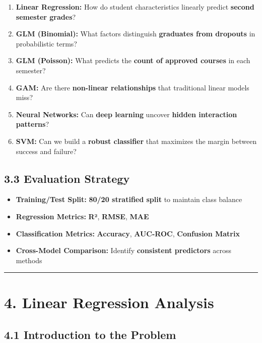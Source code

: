 \documentclass[
]{article}
\providecommand{\tightlist}{%
  \setlength{\itemsep}{0pt}\setlength{\parskip}{0pt}}
\begin{document}
\begin{enumerate}
\def\labelenumi{\arabic{enumi}.}
\tightlist
\item
  \textbf{Linear Regression:} How do student characteristics linearly
  predict \textbf{second semester grades}?
\item
  \textbf{GLM (Binomial):} What factors distinguish \textbf{graduates
  from dropouts} in probabilistic terms?
\item
  \textbf{GLM (Poisson):} What predicts the \textbf{count of approved
  courses} in each semester?
\item
  \textbf{GAM:} Are there \textbf{non-linear relationships} that
  traditional linear models miss?
\item
  \textbf{Neural Networks:} Can \textbf{deep learning} uncover
  \textbf{hidden interaction patterns}?
\item
  \textbf{SVM:} Can we build a \textbf{robust classifier} that maximizes
  the margin between success and failure?
\end{enumerate}

\subsection{3.3 Evaluation Strategy}\label{evaluation-strategy}

\begin{itemize}
\tightlist
\item
  \textbf{Training/Test Split:} \textbf{80/20 stratified split} to
  maintain class balance
\item
  \textbf{Regression Metrics:} \textbf{R²}, \textbf{RMSE}, \textbf{MAE}
\item
  \textbf{Classification Metrics:} \textbf{Accuracy}, \textbf{AUC-ROC},
  \textbf{Confusion Matrix}
\item
  \textbf{Cross-Model Comparison:} Identify \textbf{consistent
  predictors} across methods
\end{itemize}

\begin{center}\rule{0.5\linewidth}{0.5pt}\end{center}

\section{4. Linear Regression
Analysis}\label{linear-regression-analysis}

\subsection{4.1 Introduction to the
Problem}\label{introduction-to-the-problem}
\end{document}
